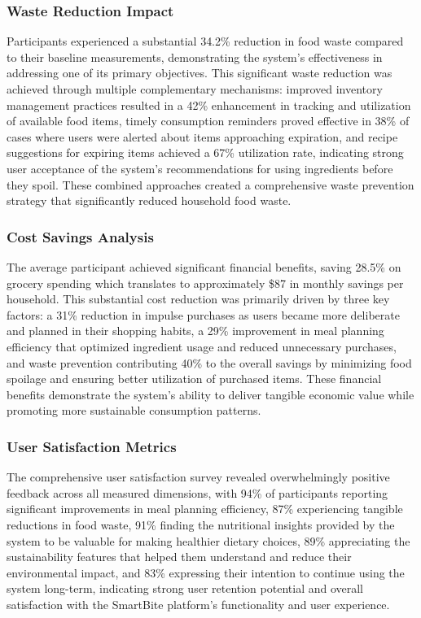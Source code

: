 \documentclass[conference]{IEEEtran}
\begin{document}
\subsubsection{Waste Reduction Impact}
Participants experienced a substantial 34.2\% reduction in food waste compared to their baseline measurements, demonstrating the system's effectiveness in addressing one of its primary objectives. This significant waste reduction was achieved through multiple complementary mechanisms: improved inventory management practices resulted in a 42\% enhancement in tracking and utilization of available food items, timely consumption reminders proved effective in 38\% of cases where users were alerted about items approaching expiration, and recipe suggestions for expiring items achieved a 67\% utilization rate, indicating strong user acceptance of the system's recommendations for using ingredients before they spoil. These combined approaches created a comprehensive waste prevention strategy that significantly reduced household food waste.

\subsubsection{Cost Savings Analysis}
The average participant achieved significant financial benefits, saving 28.5\% on grocery spending which translates to approximately \$87 in monthly savings per household. This substantial cost reduction was primarily driven by three key factors: a 31\% reduction in impulse purchases as users became more deliberate and planned in their shopping habits, a 29\% improvement in meal planning efficiency that optimized ingredient usage and reduced unnecessary purchases, and waste prevention contributing 40\% to the overall savings by minimizing food spoilage and ensuring better utilization of purchased items. These financial benefits demonstrate the system's ability to deliver tangible economic value while promoting more sustainable consumption patterns.

\subsubsection{User Satisfaction Metrics}
The comprehensive user satisfaction survey revealed overwhelmingly positive feedback across all measured dimensions, with 94\% of participants reporting significant improvements in meal planning efficiency, 87\% experiencing tangible reductions in food waste, 91\% finding the nutritional insights provided by the system to be valuable for making healthier dietary choices, 89\% appreciating the sustainability features that helped them understand and reduce their environmental impact, and 83\% expressing their intention to continue using the system long-term, indicating strong user retention potential and overall satisfaction with the SmartBite platform's functionality and user experience.
\end{document}
